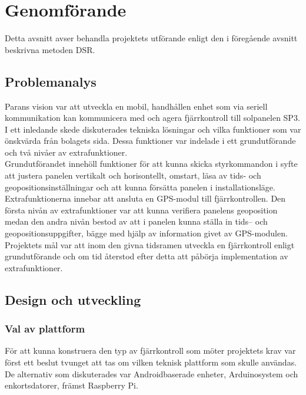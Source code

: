 \documentclass{article}
\begin{document}
    \newpage

    \section{Genomförande} %
    \label{sec:genomforande}
        Detta avsnitt avser behandla projektets utförande enligt den i föregående avsnitt beskrivna metoden DSR.
        
        \subsection{Problemanalys} %
        \label{sub:problemanalys}
            Parans vision var att utveckla en mobil, handhållen enhet som via seriell kommunikation kan kommunicera med och agera fjärrkontroll till solpanelen SP3.  I ett inledande skede diskuterades tekniska lösningar och vilka funktioner som var önskvärda från bolagets sida. Dessa funktioner var indelade i ett grundutförande och två nivåer av extrafunktioner. \\
            
            \noindent Grundutförandet innehöll funktioner för att kunna skicka styrkommandon i syfte att justera panelen vertikalt och horisontellt, omstart, läsa av tids- och geopositionsinställningar och att kunna försätta panelen i installationsläge. \\
            
            \noindent Extrafunktionerna innebar att ansluta en GPS-modul till fjärrkontrollen. Den första nivån av extrafunktioner var att kunna verifiera panelens geoposition medan den andra nivån bestod av att i panelen kunna ställa in tids-- och geopositionsuppgifter, bägge med hjälp av information givet av GPS-modulen. Projektets mål var att inom den givna tidsramen utveckla en fjärrkontroll enligt grundutförande och om tid återstod efter detta att påbörja implementation av extrafunktioner.

        \subsection{Design och utveckling} %
        \label{sub:design_och_utveckling}
        
            \subsubsection{Val av plattform} %
            \label{subsub:val_av_plattform}
            För att kunna konstruera den typ av fjärrkontroll som möter projektets krav var först ett beslut tvunget att tas om vilken teknisk plattform som skulle användas. De alternativ som diskuterades var Androidbaserade enheter, Arduinosystem och enkortsdatorer, främst Raspberry Pi.\\
            
\end{document}
